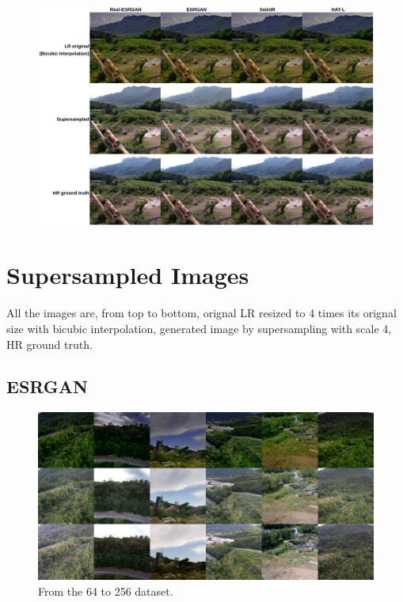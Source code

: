 \begin{figure}[H]
  \includegraphics[scale=0.45]{figures/allegati/sbs_3.png}
  \label{img:sbs3}
\end{figure}

\newpage
\section{Supersampled Images}
All the images are, from top to bottom, orignal LR resized to 4 times its orignal size with bicubic interpolation, generated image by supersampling with scale 4, HR ground truth.

\subsection{ESRGAN}

\begin{figure}[H]
  \centering
  \includegraphics[scale=0.45]{figures/allegati/esrgan_64.png}
  \caption{From the 64 to 256 dataset.}
  \label{img:esrgan_att}
\end{figure}

